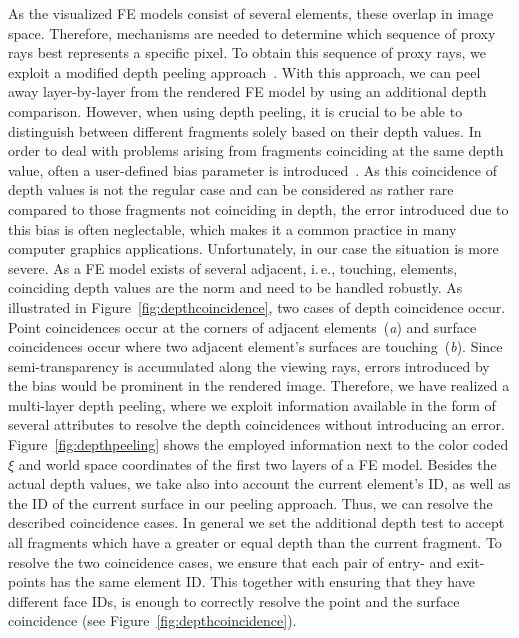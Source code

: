 \documentclass[review,journal]{vgtc}         %
\begin{document}
As the visualized FE models consist of several elements, these overlap in image space. Therefore, mechanisms are needed to determine which sequence of proxy rays best represents a specific pixel. To obtain this sequence of proxy rays, we exploit a modified depth peeling approach~\cite{mammen89DepthPeeling}. With this approach, we can peel away layer-by-layer from the rendered FE model by using an additional depth comparison. However, when using depth peeling, it is crucial to be able to distinguish between different fragments solely based on their depth values. In order to deal with problems arising from fragments coinciding at the same depth value, often a user-defined bias parameter is introduced~\cite{Everitt01interactiveorder-independent}. As this coincidence of depth values is not the regular case and can be considered as rather rare compared to those fragments not coinciding in depth, the error introduced due to this bias is often neglectable, which makes it a common practice in many computer graphics applications. Unfortunately, in our case the situation is more severe. As a FE model exists of several adjacent, i.\,e., touching, elements, coinciding depth values are the norm and need to be handled robustly. As illustrated in Figure~\ref{fig:depthcoincidence}, two cases of depth coincidence occur. Point coincidences occur at the corners of adjacent elements~({\it a}) and surface coincidences occur where two adjacent element's surfaces are touching~({\it b}). Since semi-transparency is accumulated along the viewing rays, errors introduced by the bias would be prominent in the rendered image. Therefore, we have realized a multi-layer depth peeling, where we exploit information available in the form of several attributes to resolve the depth coincidences without introducing an error. Figure~\ref{fig:depthpeeling} shows the employed information next to the color coded $\xi$ and world space coordinates of the first two layers of a FE model. Besides the actual depth values, we take also into account the current element's ID, as well as the ID of the current surface in our peeling approach. Thus, we can resolve the described coincidence cases. In general we set the additional depth test to accept all fragments which have a greater or equal depth than the current fragment. To resolve the two coincidence cases, we ensure that each pair of entry- and exit-points has the same element ID. This together with ensuring that they have different face IDs, is enough to correctly resolve the point and the surface coincidence (see Figure~\ref{fig:depthcoincidence}).
\end{document}
